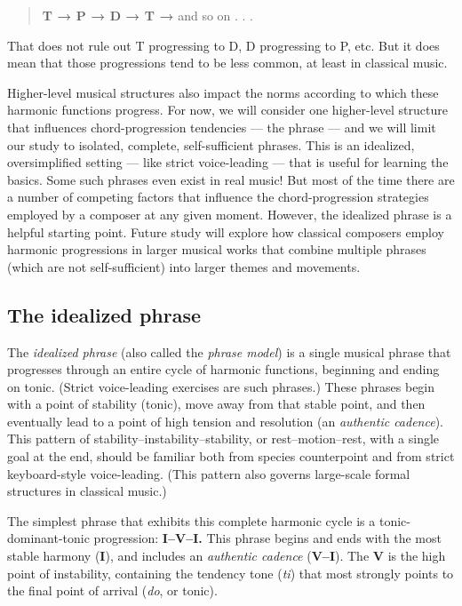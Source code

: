 \documentclass{book}
\begin{document}
\begin{quote}
\textbf{T → P → D → T →} and so on . . .
\end{quote}

That does not rule out T progressing to D, D progressing to P, etc. But it
does mean that those progressions tend to be less common, at least in
classical music.

Higher-level musical structures also impact the norms according to which these
harmonic functions progress. For now, we will consider one higher-level
structure that influences chord-progression tendencies --- the phrase --- and
we will limit our study to isolated, complete, self-sufficient phrases. This
is an idealized, oversimplified setting --- like strict voice-leading --- that
is useful for learning the basics. Some such phrases even exist in real music!
But most of the time there are a number of competing factors that influence
the chord-progression strategies employed by a composer at any given moment.
However, the idealized phrase is a helpful starting point. Future study will
explore how classical composers employ harmonic progressions in larger musical
works that combine multiple phrases (which are not self-sufficient) into
larger themes and movements.

\hypertarget{the-idealized-phrase-1}{%
\subsection{The idealized phrase}\label{the-idealized-phrase-1}}

The \emph{idealized phrase} (also called the \emph{phrase model}) is a single
musical phrase that progresses through an entire cycle of harmonic functions,
beginning and ending on tonic. (Strict voice-leading exercises are such
phrases.) These phrases begin with a point of stability (tonic), move away
from that stable point, and then eventually lead to a point of high tension
and resolution (an \emph{authentic cadence}). This pattern of
stability--instability--stability, or rest--motion--rest, with a single goal
at the end, should be familiar both from species counterpoint and from strict
keyboard-style voice-leading. (This pattern also governs large-scale formal
structures in classical music.)

The simplest phrase that exhibits this complete harmonic cycle is a
tonic-dominant-tonic progression: \textbf{I--V--I.} This phrase begins and
ends with the most stable harmony (\textbf{I}), and includes an
\emph{authentic cadence} (\textbf{V--I}). The \textbf{V} is the high point of
instability, containing the tendency tone (\emph{ti}) that most strongly
points to the final point of arrival (\emph{do}, or tonic).
\end{document}
